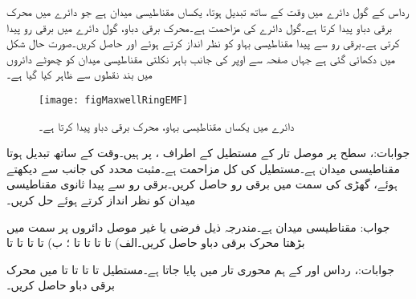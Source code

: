 \newpage
{}

رداس  کے گول دائرے میں وقت کے ساتھ تبدیل ہوتا، یکساں مقناطیسی میدان  ہے جو دائرے میں محرک برقی دباو  پیدا کرتا ہے۔گول دائرے کی مزاحمت  ہے۔محرک برقی دباو،  گول دائرے میں برقی رو  پیدا کرتی ہے۔برقی رو  سے پیدا مقناطیسی بہاو کو نظر انداز کرتے ہوئے  اور  حاصل کریں۔صورت حال شکل  میں دکھائی گئی ہے جہاں صفحہ سے اوپر کی جانب باہر نکلتی مقناطیسی میدان کو چھوٹے دائروں میں بند نقطوں سے ظاہر کیا گیا ہے۔
\begin{figure}
\centering
\texttt{[image: figMaxwellRingEMF]}
\caption{دائرے میں یکساں مقناطیسی بہاو، محرک برقی دباو پیدا کرتا ہے۔}
\label{شکل_سوال_میکس_ویل_دائرہ_محرک_دباو}
\end{figure}

جوابات:، 
سطح  پر موصل تار کے مستطیل کے اطراف ،  پر ہیں۔وقت کے ساتھ تبدیل ہوتا مقناطیسی میدان  ہے۔مستطیل کی کل مزاحمت  ہے۔مثبت  محدد کی جانب سے دیکھتے ہوئے، گھڑی کی سمت میں برقی رو حاصل کریں۔برقی رو سے پیدا ثانوی مقناطیسی میدان کو نظر انداز کرتے ہوئے حل کریں۔

جواب: 
مقناطیسی میدان  ہے۔مندرجہ ذیل فرضی یا غیر موصل دائروں پر  سمت میں بڑھتا محرک برقی دباو حاصل کریں۔الف)  تا  تا  تا  تا ؛ ب)  تا  تا  تا  تا  

جوابات:، 
رداس  اور  کے ہم محوری تار
 میں  پایا جاتا ہے۔مستطیل  تا  تا  تا  تا    میں محرک برقی دباو حاصل کریں۔

